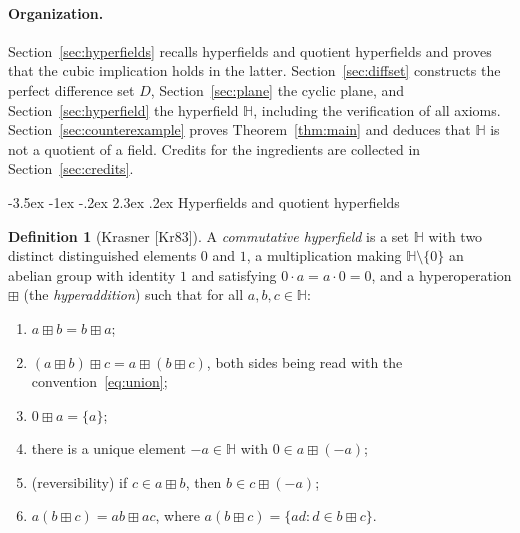 \documentclass[11pt]{article}
\makeatletter
\renewcommand\section{\@startsection{section}{1}{\z@}
  {-3.5ex \@plus -1ex \@minus -.2ex}
  {2.3ex \@plus.2ex}
  {\normalfont\bfseries}}
\theoremstyle{plain}
\theoremstyle{definition}
\newtheorem{definition}[theorem]{Definition}
\newcommand{\Hh}{\mathbb{H}}
\newcommand{\bp}{\boxplus}
\makeatother
\begin{document}
\paragraph{Organization.}
Section~\ref{sec:hyperfields} recalls hyperfields and quotient
hyperfields and proves that the cubic implication holds in the latter.
Section~\ref{sec:diffset} constructs the perfect difference set $D$,
Section~\ref{sec:plane} the cyclic plane, and
Section~\ref{sec:hyperfield} the hyperfield $\Hh$, including the
verification of all axioms.  Section~\ref{sec:counterexample} proves
Theorem~\ref{thm:main} and deduces that $\Hh$ is not a quotient of a
field.  Credits for the ingredients are collected in
Section~\ref{sec:credits}.

\section{Hyperfields and quotient hyperfields}\label{sec:hyperfields}
\begin{definition}[Krasner {[Kr83]}]\label{def:hyperfield}
A \emph{commutative hyperfield} is a set $\Hh$ with two distinct
distinguished elements $0$ and $1$, a multiplication making
$\Hh\setminus\{0\}$ an abelian group with identity $1$ and satisfying
$0\cdot a=a\cdot 0=0$, and a hyperoperation $\bp$ (the
\emph{hyperaddition}) such that for all $a,b,c\in\Hh$:
\begin{enumerate}
\item[(H1)] $a\bp b=b\bp a$;
\item[(H2)] $(a\bp b)\bp c=a\bp(b\bp c)$, both sides being read with the
convention~\eqref{eq:union};
\item[(H3)] $0\bp a=\{a\}$;
\item[(H4)] there is a unique element $-a\in\Hh$ with $0\in a\bp(-a)$;
\item[(H5)] (reversibility) if $c\in a\bp b$, then $b\in c\bp(-a)$;
\item[(H6)] $a(b\bp c)=ab\bp ac$, where $a(b\bp c)=\{ad:d\in b\bp c\}$.
\end{enumerate}
\end{definition}
\end{document}
